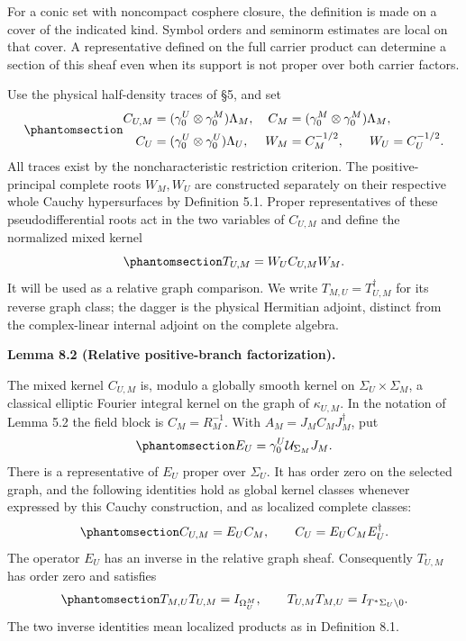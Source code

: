 \documentclass[
  english,
  11pt,
  reqno]{amsart}
\makeatletter
\newcommand{\pandocstatementheading}[1]{%
  \par\addpenalty{\@beginparpenalty}%
  \addvspace{.5\baselineskip plus .2\baselineskip minus .2\baselineskip}%
  {\normalfont\bfseries #1\par}%
  \nobreak\@afterindenttrue\@afterheading
}
\makeatother
\begin{document}
For a conic set with noncompact cosphere closure, the definition is made
on a cover of the indicated kind. Symbol orders and seminorm estimates
are local on that cover. A representative defined on the full carrier
product can determine a section of this sheaf even when its support is
not proper over both carrier factors.

Use the physical half-density traces of §5, and set
\begin{equation}\protect\phantomsection\label{eq:relative-mixed-traces}{
\begin{aligned}
C_{U,M}&=(\gamma_0^U\otimes\gamma_0^M)\Lambda_M,&
C_M&=(\gamma_0^M\otimes\gamma_0^M)\Lambda_M,\\
C_U&=(\gamma_0^U\otimes\gamma_0^U)\Lambda_U,&
W_M&=C_M^{-1/2},\qquad W_U=C_U^{-1/2}.
\end{aligned}
}\end{equation} All traces exist by the noncharacteristic restriction
criterion. The positive-principal complete roots \(W_M,W_U\) are
constructed separately on their respective whole Cauchy hypersurfaces by
Definition 5.1. Proper representatives of these pseudodifferential roots
act in the two variables of \(C_{U,M}\) and define the normalized mixed
kernel
\begin{equation}\protect\phantomsection\label{eq:relative-normalized-carrier}{
T_{U,M}=W_U C_{U,M}W_M.
}\end{equation} It will be used as a relative graph comparison. We write
\(T_{M,U}=T_{U,M}^{\dagger}\) for its reverse graph class; the dagger is
the physical Hermitian adjoint, distinct from the complex-linear
internal adjoint on the complete algebra.

\pandocstatementheading{\protect{}\label{lem:relative-positive-factorization}Lemma 8.2 (Relative positive-branch factorization).}

The mixed kernel \(C_{U,M}\) is, modulo a globally smooth kernel on
\(\Sigma_U\times\Sigma_M\), a classical elliptic Fourier integral kernel
on the graph of \(\kappa_{U,M}\). In the notation of Lemma 5.2 the field
block is \(C_M=R_M^{-1}\). With \(A_M=J_MC_MJ_M^{\dagger}\), put
\begin{equation}\protect\phantomsection\label{eq:relative-positive-field-transfer}{
E_U=\gamma_0^U\mathcal U_{\Sigma_M}J_M.
}\end{equation} There is a representative of \(E_U\) proper over
\(\Sigma_U\). It has order zero on the selected graph, and the following
identities hold as global kernel classes whenever expressed by this
Cauchy construction, and as localized complete classes:
\begin{equation}\protect\phantomsection\label{eq:relative-positive-factorization}{
C_{U,M}=E_U C_M,
\qquad
C_U=E_U C_M E_U^{\dagger}.
}\end{equation} The operator \(E_U\) has an inverse in the relative
graph sheaf. Consequently \(T_{U,M}\) has order zero and satisfies
\begin{equation}\protect\phantomsection\label{eq:relative-carrier-inverse}{
T_{M,U}T_{U,M}=I_{\Omega_U^M},
\qquad
T_{U,M}T_{M,U}=I_{T^*\Sigma_U\setminus0}.
}\end{equation} The two inverse identities mean localized products as in
Definition 8.1.
\end{document}
